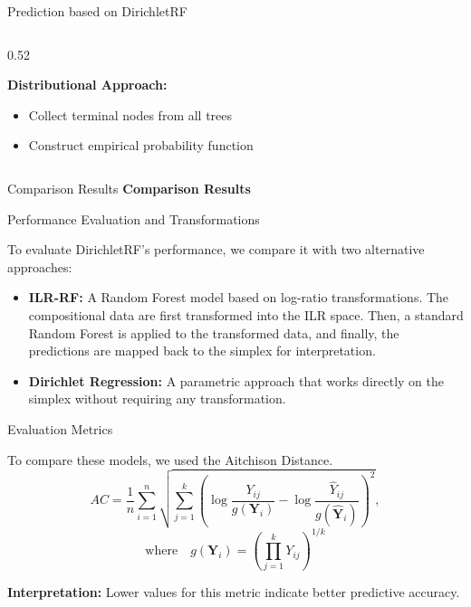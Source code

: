 \begin{frame}{Prediction based on DirichletRF}
\begin{columns}[T]
\begin{column}{0.52\textwidth}
  \vspace{0.4cm}

  \textbf{Distributional Approach:}
  \begin{itemize}
    \item Collect terminal nodes from all trees
    \item Construct empirical probability function
  \end{itemize}
  \end{column}

\end{columns}

\end{frame}


\begin{frame}{Comparison Results}
  \centering
  \vfill
  \textbf{\Large Comparison Results}
  \vfill
\end{frame}


\begin{frame}{Performance Evaluation and Transformations}

To evaluate DirichletRF's performance, we compare it with two alternative approaches:
\begin{itemize}
  \item[1)] \textbf{ILR-RF:} A Random Forest model based on log-ratio transformations.
    The compositional data are first transformed into the ILR space. Then, a standard Random Forest is applied to the transformed data, and finally, the predictions are mapped back to the simplex for interpretation.

  \item[2)] \textbf{Dirichlet Regression:} A parametric approach that works directly on the simplex without requiring any transformation.
\end{itemize}

\end{frame}


\begin{frame}{Evaluation Metrics}

To compare these models, we used the Aitchison Distance.
\vspace{0.2cm}
\[
  AC = \frac{1}{n} \sum_{i=1}^n \sqrt{\sum_{j=1}^k
    \left(\log\frac{Y_{ij}}{g(\mathbf{Y}_i)} - \log\frac{\hat{Y}_{ij}}{g(\hat{\mathbf{Y}}_i)}\right)^2},
\]
\[
  \text{where} \quad g(\mathbf{Y}_i) = \left(\prod_{j=1}^k Y_{ij}\right)^{1/k}
\]

\vspace{0.3cm}
\textbf{Interpretation:} Lower values for this metric indicate better predictive accuracy.
\end{frame}



